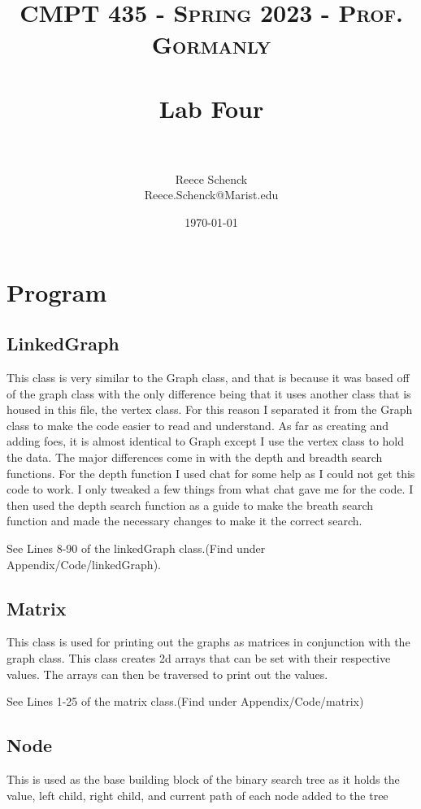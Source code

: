\documentclass[10pt]{article}
\title{	
   \normalfont \normalsize 
   \textsc{CMPT 435 - Spring 2023 - Prof. Gormanly} \\[10pt] %
   \horrule{0.5pt} \\[0.25cm] 	%
   \huge Lab Four  \\     	    %
   \horrule{0.5pt} \\[0.25cm] 	%
}
\author{Reece Schenck \\ \normalsize Reece.Schenck@Marist.edu}
\date{\normalsize\today} 	%
\begin{document}
\maketitle %

\section{Program}

\subsection{LinkedGraph}

This class is very similar to the Graph class, and that is because it was based off of the graph class with the only difference being that it uses another class that is housed in this file, the vertex class. For this reason I separated it from the Graph class to make the code easier to read and understand. As far as creating and adding foes, it is almost identical to Graph except I use the vertex class to hold the data. The major differences come in with the depth and breadth search functions. For the depth function I used chat for some help as I could not get this code to work. I only tweaked a few things from what chat gave me for the code. I then used the depth search function as a guide to make the breath search function and made the necessary changes to make it the correct search.

See Lines 8-90 of the linkedGraph class.(Find under Appendix/Code/linkedGraph).

\subsection{Matrix}

This class is used for printing out the graphs as matrices in conjunction with the graph class. This class creates 2d arrays that can be set with their respective values. The arrays can then be traversed to print out the values.


See Lines 1-25 of the matrix class.(Find under Appendix/Code/matrix)

\subsection{Node}
This is used as the base building block of the binary search tree as it holds the value, left child, right child, and current path of each node added to the tree
\end{document}
